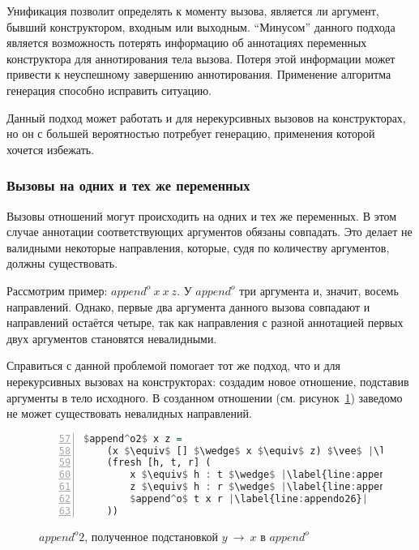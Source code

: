 Унификация позволит определять к моменту вызова, является ли аргумент, бывший конструктором, входным или выходным.
``Минусом'' данного подхода является возможность потерять информацию об аннотациях переменных конструктора для аннотирования тела вызова.
Потеря этой информации может привести к неуспешному завершению аннотирования.
Применение алгоритма генерация способно исправить ситуацию.

Данный подход может работать и для нерекурсивных вызовов на конструкторах, но он с большей вероятностью потребует генерацию, применения которой хочется избежать.


\subsubsection{Вызовы на одних и тех же переменных}

Вызовы отношений могут происходить на одних и тех же переменных.
В этом случае аннотации соответствующих аргументов обязаны совпадать.
Это делает не валидными некоторые направления, которые, судя по количеству аргументов, должны существовать.

Рассмотрим пример: $append^o~x~x~z$.
У $append^o$ три аргумента и, значит, восемь направлений.
Однако, первые два аргумента данного вызова совпадают и направлений остаётся четыре, так как направления с разной аннотацией первых двух аргументов становятся невалидными.

Справиться с данной проблемой помогает тот же подход, что и для нерекурсивных вызовах на конструкторах: создадим новое отношение, подставив аргументы в тело исходного.
В созданном отношении (см. рисунок~\ref{lst:appendo2}) заведомо не может существовать невалидных направлений.
\begin{figure}[h!]
  \begin{center}
  \begin{minipage}{0.4\textwidth}
  \begin{lstlisting}[language=Haskell, frame=single, numbers=left,numberstyle=\small, firstnumber=57, escapechar=|]
  $append^o2$ x z =
    (x $\equiv$ [] $\wedge$ x $\equiv$ z) $\vee$ |\label{line:appendo22}|
    (fresh [h, t, r] (
        x $\equiv$ h : t $\wedge$ |\label{line:appendo24}|
        z $\equiv$ h : r $\wedge$ |\label{line:appendo25}|
        $append^o$ t x r |\label{line:appendo26}|
    ))
    \end{lstlisting}
  \end{minipage}
  \end{center}
  \caption{$append^o2$, полученное подстановкой $y~\rightarrow~x$ в $append^o$}
  \label{lst:appendo2}
\end{figure}
